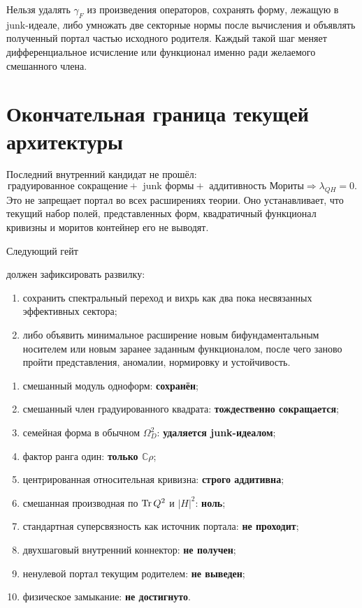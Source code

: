 \begin{nogocriterion}
Нельзя удалять $\gamma_F$ из произведения операторов, сохранять форму,
лежащую в junk-идеале, либо умножать две секторные нормы после вычисления
и объявлять полученный портал частью исходного родителя. Каждый такой шаг
меняет дифференциальное исчисление или функционал именно ради желаемого
смешанного члена.
\end{nogocriterion}

\section{Окончательная граница текущей архитектуры}

Последний внутренний кандидат не прошёл:
\begin{equation}
 \boxed{
 \text{градуированное сокращение}
 +\text{ junk формы}
 +\text{ аддитивность Мориты}
 \Longrightarrow \lambda_{QH}=0.
 }
\end{equation}
Это не запрещает портал во всех расширениях теории. Оно устанавливает,
что текущий набор полей, представленных форм, квадратичный функционал
кривизны и моритов контейнер его не выводят.

Следующий гейт
\begin{sloppypar}
\end{sloppypar}
должен зафиксировать развилку:
\begin{enumerate}
 \item сохранить спектральный переход и вихрь как два пока несвязанных
 эффективных сектора;
 \item либо объявить минимальное расширение новым бифундаментальным
 носителем или новым заранее заданным функционалом, после чего заново
 пройти представления, аномалии, нормировку и устойчивость.
\end{enumerate}

\begin{protocol}
\begin{enumerate}
 \item смешанный модуль одноформ: \textbf{сохранён};
 \item смешанный член градуированного квадрата:
 \textbf{тождественно сокращается};
 \item семейная форма в обычном $\Omega_D^2$:
 \textbf{удаляется junk-идеалом};
 \item фактор ранга один: \textbf{только $\mathbb C\rho$};
 \item центрированная относительная кривизна:
 \textbf{строго аддитивна};
 \item смешанная производная по $\operatorname{Tr} Q^2$ и $|H|^2$:
 \textbf{ноль};
 \item стандартная суперсвязность как источник портала:
 \textbf{не проходит};
 \item двухшаговый внутренний коннектор:
 \textbf{не получен};
 \item ненулевой портал текущим родителем:
 \textbf{не выведен};
 \item физическое замыкание: \textbf{не достигнуто}.
\end{enumerate}
\end{protocol}

